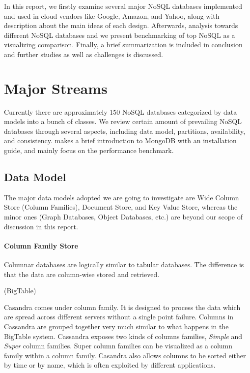 \documentclass[12pt,letter]{article}
\begin{document}
In this report, we firstly examine several major NoSQL databases implemented and used in cloud vendors like Google, Amazon, and Yahoo, along with description about the main ideas of each design. Afterwards, analysis towards different NoSQL databases and we present benchmarking of top NoSQL as a visualizing comparison. Finally, a brief summarization is included in conclusion and further studies as well as challenges is discussed.

\section{Major Streams}
Currently there are approximately 150 NoSQL databases categorized by data models into a bunch of classes.\citep{Unknown2012} We review certain amount of prevailing NoSQL databases through several aspects, including data model, partitions, availability, and consistency. \citep{Suter2012} makes a brief introduction to MongoDB with an installation guide, and mainly focus on the performance benchmark.

\subsection{Data Model}
The major data models adopted we are going to investigate are Wide Column Store (Column Families), Document Store, and Key Value Store, whereas the minor ones (Graph Databases, Object Databases, etc.) are beyond our scope of discussion in this report.

\paragraph*{Column Family Store}
Columnar databases are logically similar to tabular databases. The difference is that the data are  column-wise stored and retrieved.

(BigTable)

Casandra comes under column family. It is designed to process the data which are spread across different servers without a single point failure. Columns in Cassandra are grouped together very much similar to what happens in the BigTable\citep{Chang2006} system. Cassandra\citep{LakshamAvinash2010} exposes two kinds of columns families, \textit{Simple} and \textit{Super} column families. Super column families can be visualized as a column family within a column family. Casandra also allows columns to be sorted either by time or by name, which is often exploited by different applications.
\end{document}
